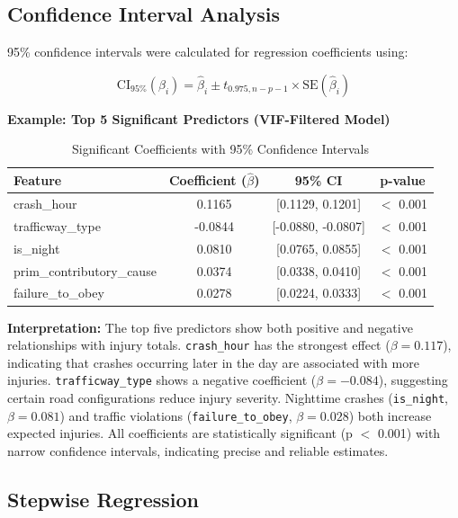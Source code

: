 \documentclass[stu,12pt,floatsintext]{apa7}
\begin{document}
\subsection{Confidence Interval Analysis}

95\% confidence intervals were calculated for regression coefficients using:

\begin{equation}
\mathrm{CI}_{95\%}(\beta_i) = \hat{\beta}_i \pm t_{0.975, n-p-1} \times \mathrm{SE}(\hat{\beta}_i)
\end{equation}

\textbf{Example: Top 5 Significant Predictors (VIF-Filtered Model)}

\begin{table}[H]
\centering
\caption{Significant Coefficients with 95\% Confidence Intervals}
\begin{tabular}{lccc}
\toprule
\textbf{Feature} & \textbf{Coefficient ($\hat{\beta}$)} & \textbf{95\% CI} & \textbf{p-value} \\
\midrule
crash\_hour & 0.1165 & [0.1129, 0.1201] & $<$ 0.001 \\
trafficway\_type & -0.0844 & [-0.0880, -0.0807] & $<$ 0.001 \\
is\_night & 0.0810 & [0.0765, 0.0855] & $<$ 0.001 \\
prim\_contributory\_cause & 0.0374 & [0.0338, 0.0410] & $<$ 0.001 \\
failure\_to\_obey & 0.0278 & [0.0224, 0.0333] & $<$ 0.001 \\
\bottomrule
\end{tabular}
\end{table}

\textbf{Interpretation:} The top five predictors show both positive and negative relationships with injury totals. 
\texttt{crash\_hour} has the strongest effect ($\beta = 0.117$), indicating that crashes occurring later in the day 
are associated with more injuries. \texttt{trafficway\_type} shows a negative coefficient ($\beta = -0.084$), 
suggesting certain road configurations reduce injury severity. Nighttime crashes (\texttt{is\_night}, $\beta = 0.081$) 
and traffic violations (\texttt{failure\_to\_obey}, $\beta = 0.028$) both increase expected injuries. All 
coefficients are statistically significant (p $<$ 0.001) with narrow confidence intervals, indicating precise 
and reliable estimates.

\subsection{Stepwise Regression}
\end{document}

